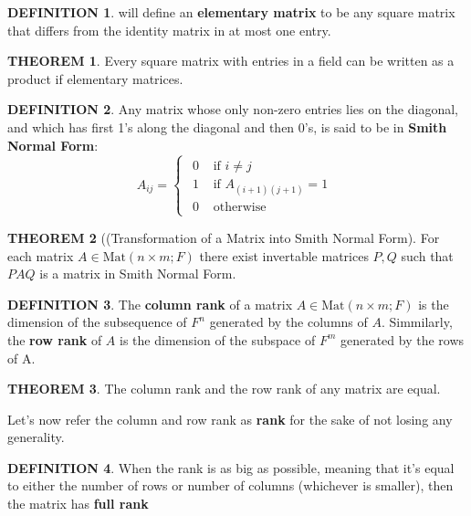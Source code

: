 \documentclass[12pt]{article}
\theoremstyle{definition}
\newtheorem{definition}{DEFINITION}[subsection]
\newtheorem{theorem}{THEOREM}[subsection]
\newcommand{\Mat}{\text{Mat}}
\begin{document}
\begin{definition}
    will define an \textbf{elementary matrix} to be any square matrix that differs from the identity matrix in at most one entry.
\end{definition}

\begin{theorem}
    Every square matrix with entries in a field can be written as a product if elementary matrices.
\end{theorem}

\begin{definition}
    Any matrix whose only non-zero entries lies on the diagonal, and which has first 1's along the diagonal and then 0's, is said to be in \textbf{Smith Normal Form}:
    \[A_{ij} = \begin{cases}\begin{split}
        0 &\text{ if } i \neq j\\
        1 &\text{ if } A_{(i+1)(j+1)} = 1\\
        0 &\text{ otherwise}
    \end{split}\end{cases}\]
\end{definition}

\begin{theorem}[(Transformation of a Matrix into Smith Normal Form]
    For each matrix $A \in \Mat(n\times m;F)$ there exist invertable matrices $P,Q$ such that $PAQ$ is a matrix in Smith Normal Form.
\end{theorem}

\begin{definition}
    The \textbf{column rank} of a matrix $A \in \Mat(n\times m;F)$ is the dimension of the subsequence of $F^n$ generated by the columns of $A$. Simmilarly, the \textbf{row rank} of $A$ is the dimension of the subspace of $F^m$ generated by the rows of A.
\end{definition}

\begin{theorem}
    The column rank and the row rank of any matrix are equal.
\end{theorem}

Let's now refer the column and row rank as \textbf{rank} for the sake of not losing any generality.

\begin{definition}
    When the rank is as big as possible, meaning that it's equal to either the number of rows or number of columns (whichever is smaller), then the matrix has \textbf{full rank}
\end{definition}
\end{document}
